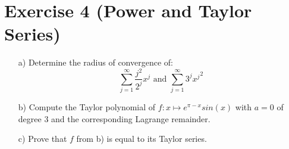 \documentclass[10pt]{article}
\numberwithin{equation}{section}
\begin{document}
\section*{Exercise 4 (Power and Taylor Series)}


\begin{enumerate}
\item[a)]{
    Determine the radius of convergence of:
    $$\sum_{j=1}^{\infty} \frac{j^2}{2^j}x^j \text{ and }\sum_{j=1}^{\infty} 3^j {x^j}^2$$
  }
\item[b)]{
    Compute the Taylor polynomial of $f: x \mapsto e^{\pi -x} sin(x)$ with $a=0$ of degree $3$ and the corresponding Lagrange remainder.
  }
\item[c)]{
    Prove that $f$ from b) is equal to its Taylor series.
  }
\end{enumerate}
\end{document}
